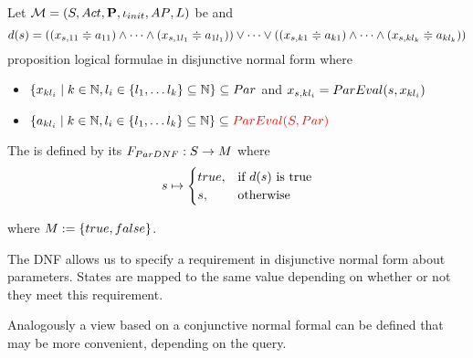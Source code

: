 \documentclass[preview]{standalone}
\begin{document}
\begin{definition}
	Let $\chgph = \chgphtuple$ be \chosengraphtypeN and 
	\[
	d(s) = ((\paramstate[,11] \eqorneq \paramval_{11}) \land \dots \land (\paramstate[,1l_1] \eqorneq \paramval_{1l_1})) \lor \dots \lor ((\paramstate[,k1] \eqorneq \paramval_{k1}) \land \dots \land (\paramstate[,kl_k]  \eqorneq \paramval_{kl_k}))
	\]
	proposition logical formulae in disjunctive normal form where
	\begin{itemize}
		\item $\{\param_{kl_i} \mid k \in \natnums, l_i \in \{l_1, \dots l_k\} \subseteq \natnums\} \subseteq \params$ and $\paramstate[,kl_i] = \parameval(\state, \param_{kl_i})$
		\item $\{\paramval_{kl_i} \mid k \in \natnums, l_i \in \{l_1, \dots l_k\} \subseteq \natnums\} \subseteq \redcomment{\parameval(\states,\params)}$
	\end{itemize}
	The \viewN \viewparamdnf is defined by its \grpfctN $\gfctparamdnf : \states \to \imggrp$ where
	\[
	\state \mapsto
	\begin{cases}
		true, &\text{if } d(s) \text{ is true}\\
		\remelem, 	&\text{otherwise}
	\end{cases}
	\]
	
	where $\imggrp := \{true, false\}$.
\end{definition}


The DNF allows us to specify a requirement in disjunctive normal form about parameters. States are mapped to the same value depending on whether or not they meet this requirement.


Analogously a view based on a conjunctive normal formal can be defined that may be more convenient, depending on the query.
\end{document}
